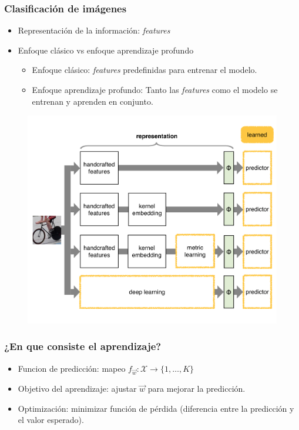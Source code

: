 \documentclass[10pt,center]{beamer}
\begin{document}
\begin{frame}
  \frametitle{Clasificación de imágenes}
  \begin{itemize}
    \item Representación de la información: \textit{features}
    \item Enfoque clásico vs enfoque aprendizaje profundo
    \begin{itemize}
      \item Enfoque clásico: \textit{features} predefinidas para entrenar el modelo.
      \item Enfoque aprendizaje profundo: Tanto las \textit{features} como el modelo se entrenan y aprenden en conjunto.
    \end{itemize}
  \end{itemize}
  \begin{figure}[h]
    \begin{center}
	    \includegraphics[height=0.6\textheight]{./img/vedaldi_shallow_deep.pdf}
    \end{center}
  \end{figure}
\end{frame}

\begin{frame}
  \frametitle{¿En que consiste el aprendizaje?}
  \begin{itemize}
    \item Funcion de predicción: mapeo $f_{\overrightarrow{w}}: \mathcal{X} {\rightarrow} \{1,\dots,K\}$
    \item Objetivo del aprendizaje: ajustar $\overrightarrow{w}$ para mejorar la predicción.
    \item Optimización: minimizar función de pérdida (diferencia entre la predicción y el valor esperado).
  \end{itemize}
\end{frame}
\end{document}
